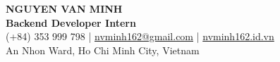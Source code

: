 \begin{center}
    {\fontsize{25}{28}\selectfont\bfseries NGUYEN VAN MINH}\\[4pt]
    {\large\bfseries Backend Developer Intern}\\[6pt]
    (+84) 353 999 798 \;|\; \href{mailto:nvminh162@gmail.com}{nvminh162@gmail.com} \;|\; \href{https://nvminh162.id.vn}{nvminh162.id.vn}\\[3pt]
    An Nhon Ward, Ho Chi Minh City, Vietnam
    \\ \vspace{-1pt}
\end{center}
